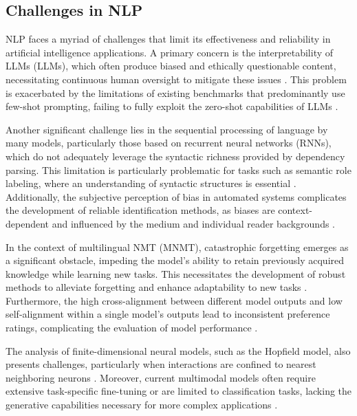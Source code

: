 
\subsection{Challenges in NLP} \label{subsec:Challenges in NLP}

NLP faces a myriad of challenges that limit its effectiveness and reliability in artificial intelligence applications. A primary concern is the interpretability of LLMs (LLMs), which often produce biased and ethically questionable content, necessitating continuous human oversight to mitigate these issues \cite{kasneci2023chatgpt}. This problem is exacerbated by the limitations of existing benchmarks that predominantly use few-shot prompting, failing to fully exploit the zero-shot capabilities of LLMs \cite{kojima2022large}.



Another significant challenge lies in the sequential processing of language by many models, particularly those based on recurrent neural networks (RNNs), which do not adequately leverage the syntactic richness provided by dependency parsing. This limitation is particularly problematic for tasks such as semantic role labeling, where an understanding of syntactic structures is essential \cite{qian2017syntaxawarelstmmodel}. Additionally, the subjective perception of bias in automated systems complicates the development of reliable identification methods, as biases are context-dependent and influenced by the medium and individual reader backgrounds \cite{spinde2021identificationbiasedtermsnews}.



In the context of multilingual NMT (MNMT), catastrophic forgetting emerges as a significant obstacle, impeding the model's ability to retain previously acquired knowledge while learning new tasks. This necessitates the development of robust methods to alleviate forgetting and enhance adaptability to new tasks \cite{zhao2022lifelonglearningmultilingualneural}. Furthermore, the high cross-alignment between different model outputs and low self-alignment within a single model's outputs lead to inconsistent preference ratings, complicating the evaluation of model performance \cite{ghosh2024comparedespairreliablepreference}.



The analysis of finite-dimensional neural models, such as the Hopfield model, also presents challenges, particularly when interactions are confined to nearest neighboring neurons \cite{koyama2001storagecapacitytwodimensionalneural}. Moreover, current multimodal models often require extensive task-specific fine-tuning or are limited to classification tasks, lacking the generative capabilities necessary for more complex applications \cite{alayrac2022flamingo}.



